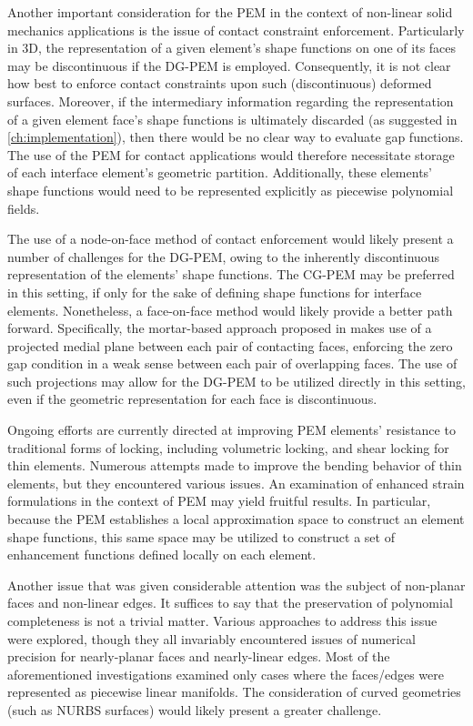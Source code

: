 Another important consideration for the PEM in the context of non-linear solid mechanics applications is the issue of contact constraint enforcement. Particularly in 3D, the representation of a given element's shape functions on one of its faces may be discontinuous if the DG-PEM is employed. Consequently, it is not clear how best to enforce contact constraints upon such (discontinuous) deformed surfaces. Moreover, if the intermediary information regarding the representation of a given element face's shape functions is ultimately discarded (as suggested in \ref{ch:implementation}), then there would be no clear way to evaluate gap functions. The use of the PEM for contact applications would therefore necessitate storage of each interface element's geometric partition. Additionally, these elements' shape functions would need to be represented explicitly as piecewise polynomial fields.

The use of a node-on-face method of contact enforcement would likely present a number of challenges for the DG-PEM, owing to the inherently discontinuous representation of the elements' shape functions. The CG-PEM may be preferred in this setting, if only for the sake of defining shape functions for interface elements. Nonetheless, a face-on-face method would likely provide a better path forward. Specifically, the mortar-based approach proposed in \cite{Wopschall:17} makes use of a projected medial plane between each pair of contacting faces, enforcing the zero gap condition in a weak sense between each pair of overlapping faces. The use of such projections may allow for the DG-PEM to be utilized directly in this setting, even if the geometric representation for each face is discontinuous.

Ongoing efforts are currently directed at improving PEM elements' resistance to traditional forms of locking, including volumetric locking, and shear locking for thin elements. Numerous attempts made to improve the bending behavior of thin elements, but they encountered various issues. An examination of enhanced strain formulations in the context of PEM may yield fruitful results. In particular, because the PEM establishes a local approximation space to construct an element shape functions, this same space may be utilized to construct a set of enhancement functions defined locally on each element.

Another issue that was given considerable attention was the subject of non-planar faces and non-linear edges. It suffices to say that the preservation of polynomial completeness is not a trivial matter. Various approaches to address this issue were explored, though they all invariably encountered issues of numerical precision for nearly-planar faces and nearly-linear edges. Most of the aforementioned investigations examined only cases where the faces/edges were represented as piecewise linear manifolds. The consideration of curved geometries (such as NURBS surfaces) would likely present a greater challenge.

